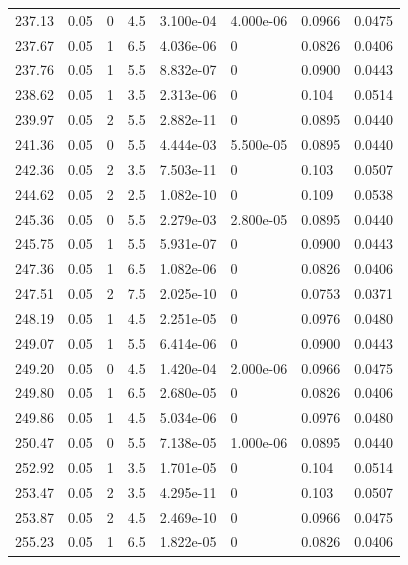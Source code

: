 \documentclass[preview]{standalone}
\begin{document}
{{{{{{\begin{tabular}{L{1.2cm}C{1.2cm} C{0.3cm}C{0.5cm} C{1.4cm}C{1.4cm} C{1.4cm}C{1.4cm}}
  237.13  &  0.05  & 0     & 4.5 &  3.100e-04  & 4.000e-06  & 0.0966 &  0.0475   \\ 
  237.67  &  0.05  & 1     & 6.5 &  4.036e-06  & 0  & 0.0826 &  0.0406   \\ 
  237.76  &  0.05  & 1     & 5.5 &  8.832e-07  & 0  & 0.0900 &  0.0443   \\ 
  238.62  &  0.05  & 1     & 3.5 &  2.313e-06  & 0  & 0.104 &  0.0514   \\ 
  239.97  &  0.05  & 2     & 5.5 &  2.882e-11  & 0  & 0.0895 &  0.0440   \\ 
  241.36  &  0.05  & 0     & 5.5 &  4.444e-03  & 5.500e-05  & 0.0895 &  0.0440   \\ 
  242.36  &  0.05  & 2     & 3.5 &  7.503e-11  & 0  & 0.103 &  0.0507   \\ 
  244.62  &  0.05  & 2     & 2.5 &  1.082e-10  & 0  & 0.109 &  0.0538   \\ 
  245.36  &  0.05  & 0     & 5.5 &  2.279e-03  & 2.800e-05  & 0.0895 &  0.0440   \\ 
  245.75  &  0.05  & 1     & 5.5 &  5.931e-07  & 0  & 0.0900 &  0.0443   \\ 
  247.36  &  0.05  & 1     & 6.5 &  1.082e-06  & 0  & 0.0826 &  0.0406   \\ 
  247.51  &  0.05  & 2     & 7.5 &  2.025e-10  & 0  & 0.0753 &  0.0371   \\ 
  248.19  &  0.05  & 1     & 4.5 &  2.251e-05  & 0  & 0.0976 &  0.0480   \\ 
  249.07  &  0.05  & 1     & 5.5 &  6.414e-06  & 0  & 0.0900 &  0.0443   \\ 
  249.20  &  0.05  & 0     & 4.5 &  1.420e-04  & 2.000e-06  & 0.0966 &  0.0475   \\ 
  249.80  &  0.05  & 1     & 6.5 &  2.680e-05  & 0  & 0.0826 &  0.0406   \\ 
  249.86  &  0.05  & 1     & 4.5 &  5.034e-06  & 0  & 0.0976 &  0.0480   \\ 
  250.47  &  0.05  & 0     & 5.5 &  7.138e-05  & 1.000e-06  & 0.0895 &  0.0440   \\ 
  252.92  &  0.05  & 1     & 3.5 &  1.701e-05  & 0  & 0.104 &  0.0514   \\ 
  253.47  &  0.05  & 2     & 3.5 &  4.295e-11  & 0  & 0.103 &  0.0507   \\ 
  253.87  &  0.05  & 2     & 4.5 &  2.469e-10  & 0  & 0.0966 &  0.0475   \\ 
  255.23  &  0.05  & 1     & 6.5 &  1.822e-05  & 0  & 0.0826 &  0.0406   \\ 

\end{tabular}}}}}}}
\end{document}
